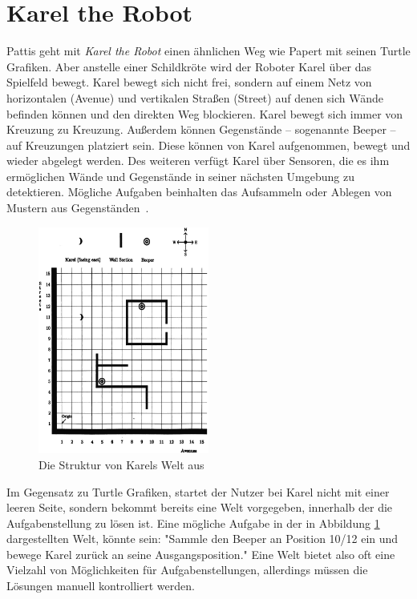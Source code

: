 \section{Karel the Robot}
\label{sec:related:karel}

Pattis geht mit \textit{Karel the Robot} einen ähnlichen Weg wie Papert mit seinen Turtle Grafiken. Aber anstelle einer Schildkröte wird der Roboter Karel über das Spielfeld bewegt. Karel bewegt sich nicht frei, sondern auf einem Netz von horizontalen (Avenue) und vertikalen Straßen (Street) auf denen sich Wände befinden können und den direkten Weg blockieren. Karel bewegt sich immer von Kreuzung zu Kreuzung. Außerdem können Gegenstände -- sogenannte Beeper -- auf Kreuzungen platziert sein. Diese können von Karel aufgenommen, bewegt und wieder abgelegt werden. Des weiteren verfügt Karel über Sensoren, die es ihm ermöglichen Wände und Gegenstände in seiner nächsten Umgebung zu detektieren. Mögliche Aufgaben beinhalten das Aufsammeln oder Ablegen von Mustern aus Gegenständen~\cite[1-3]{pattis1981}.

\begin{figure}
    \centering
    \includegraphics[width=0.5\textwidth]{gfx/related-karel.png}
    \caption{Die Struktur von Karels Welt aus~\cite[3]{pattis1981}}
    \label{fig:related:karel}
\end{figure}

Im Gegensatz zu Turtle Grafiken, startet der Nutzer bei Karel nicht mit einer leeren Seite, sondern bekommt bereits eine Welt vorgegeben, innerhalb der die Aufgabenstellung zu lösen ist. Eine mögliche Aufgabe in der in Abbildung \ref{fig:related:karel} dargestellten Welt, könnte sein: "Sammle den Beeper an Position 10/12 ein und bewege Karel zurück an seine Ausgangsposition." Eine Welt bietet also oft eine Vielzahl von Möglichkeiten für Aufgabenstellungen, allerdings müssen die Lösungen manuell kontrolliert werden.

